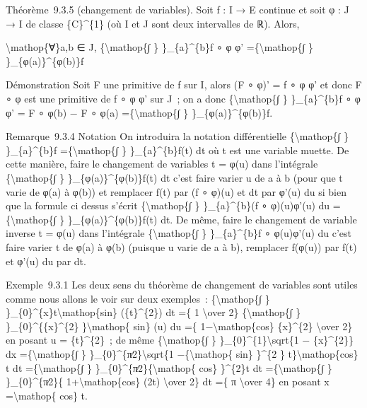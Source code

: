 \documentclass[]{article}
\begin{document}
Théorème~9.3.5 (changement de variables). Soit f : I → E continue et
soit φ : J → I de classe \{C\}\^{}\{1\} (où I et J sont deux intervalles
de ℝ). Alors,

\textbackslash{}mathop\{∀\}a,b ∈ J, \{\textbackslash{}mathop\{∫ \}
\}\_\{a\}\^{}\{b\}f ∘ φ φ' =\{\textbackslash{}mathop\{∫ \}
\}\_\{φ(a)\}\^{}\{φ(b)\}f

Démonstration Soit F une primitive de f sur I, alors (F ∘ φ)' = f ∘ φ φ'
et donc F ∘ φ est une primitive de f ∘ φ φ' sur J~; on a donc
\{\textbackslash{}mathop\{∫ \} \}\_\{a\}\^{}\{b\}f ∘ φ φ' = F ∘ φ(b) − F
∘ φ(a) =\{\textbackslash{}mathop\{∫ \} \}\_\{φ(a)\}\^{}\{φ(b)\}f.

Remarque~9.3.4 Notation On introduira la notation différentielle
\{\textbackslash{}mathop\{∫ \} \}\_\{a\}\^{}\{b\}f
=\{\textbackslash{}mathop\{∫ \} \}\_\{a\}\^{}\{b\}f(t) dt où t est une
variable muette. De cette manière, faire le changement de variables t =
φ(u) dans l'intégrale \{\textbackslash{}mathop\{∫ \}
\}\_\{φ(a)\}\^{}\{φ(b)\}f(t) dt c'est faire varier u de a à b (pour que
t varie de φ(a) à φ(b)) et remplacer f(t) par (f ∘ φ)(u) et dt par φ'(u)
du si bien que la formule ci dessus s'écrit \{\textbackslash{}mathop\{∫
\} \}\_\{a\}\^{}\{b\}(f ∘ φ)(u)φ'(u) du =\{\textbackslash{}mathop\{∫ \}
\}\_\{φ(a)\}\^{}\{φ(b)\}f(t) dt. De même, faire le changement de
variable inverse t = φ(u) dans l'intégrale \{\textbackslash{}mathop\{∫
\} \}\_\{a\}\^{}\{b\}f ∘ φ(u)φ'(u) du c'est faire varier t de φ(a) à
φ(b) (puisque u varie de a à b), remplacer f(φ(u)) par f(t) et φ'(u) du
par dt.

Exemple~9.3.1 Les deux sens du théorème de changement de variables sont
utiles comme nous allons le voir sur deux exemples~:
\{\textbackslash{}mathop\{∫ \}
\}\_\{0\}\^{}\{x\}t\textbackslash{}mathop\{sin\} (\{t\}\^{}\{2\}) dt =\{
1 \textbackslash{}over 2\} \{\textbackslash{}mathop\{∫ \}
\}\_\{0\}\^{}\{\{x\}\^{}\{2\} \}\textbackslash{}mathop\{ sin\} (u) du
=\{ 1−\textbackslash{}mathop\{cos\} \{x\}\^{}\{2\} \textbackslash{}over
2\} en posant u = \{t\}\^{}\{2\}~; de même \{\textbackslash{}mathop\{∫
\} \}\_\{0\}\^{}\{1\}\textbackslash{}sqrt\{1 − \{x\}\^{}\{2\}\} dx
=\{\textbackslash{}mathop\{∫ \}
\}\_\{0\}\^{}\{π∕2\}\textbackslash{}sqrt\{1 −\{\textbackslash{}mathop\{
sin\} \}\^{}\{2 \} t\}\textbackslash{}mathop\{cos\} t dt
=\{\textbackslash{}mathop\{∫ \}
\}\_\{0\}\^{}\{π∕2\}\{\textbackslash{}mathop\{ cos\} \}\^{}\{2\}t dt
=\{\textbackslash{}mathop\{∫ \} \}\_\{0\}\^{}\{π∕2\}\{
1+\textbackslash{}mathop\{cos\} (2t) \textbackslash{}over 2\} dt =\{ π
\textbackslash{}over 4\} en posant x =\textbackslash{}mathop\{ cos\} t.
\end{document}
